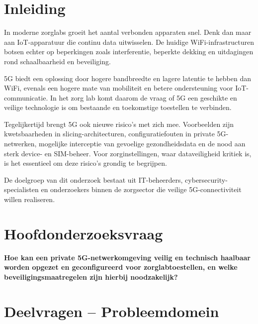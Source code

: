 
\section{Inleiding}%
\label{sec:inleiding}

In moderne zorglabs groeit het aantal verbonden apparaten snel. Denk dan maar aan IoT-apparatuur die continu data uitwisselen. De huidige WiFi-infrastructuren botsen echter op beperkingen zoals interferentie, beperkte dekking en uitdagingen rond schaalbaarheid en beveiliging.

5G biedt een oplossing door hogere bandbreedte en lagere latentie te hebben dan WiFi, evenals een hogere mate van mobiliteit en betere ondersteuning voor IoT-communicatie. In het zorg lab komt daarom de vraag of 5G een geschikte en veilige technologie is om bestaande en toekomstige toestellen te verbinden.

Tegelijkertijd brengt 5G ook nieuwe risico’s met zich mee. Voorbeelden zijn kwetsbaarheden in slicing-architecturen, configuratiefouten in private 5G-netwerken, mogelijke interceptie van gevoelige gezondheidsdata en de nood aan sterk device- en SIM-beheer. Voor zorginstellingen, waar dataveiligheid kritiek is, is het essentieel om deze risico’s grondig te begrijpen.

De doelgroep van dit onderzoek bestaat uit IT-beheerders, cybersecurity-specialisten en onderzoekers binnen de zorgsector die veilige 5G-connectiviteit willen realiseren.

\section{Hoofdonderzoeksvraag}

\textbf{Hoe kan een private 5G-netwerkomgeving veilig en technisch haalbaar worden opgezet en geconfigureerd voor zorglabtoestellen, en welke beveiligingsmaatregelen zijn hierbij noodzakelijk?}

\vspace{1em}

\section{Deelvragen -- Probleemdomein}

